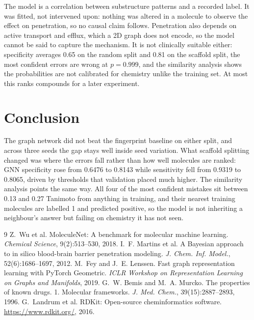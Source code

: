 \documentclass[10pt,a4paper]{article}
\begin{document}
The model is a correlation between substructure patterns and a recorded label. It was fitted, not intervened upon: nothing was altered in a molecule to observe the effect on penetration, so no causal claim follows. Penetration also depends on active transport and efflux, which a 2D graph does not encode, so the model cannot be said to capture the mechanism. It is not clinically suitable either: specificity averages 0.65 on the random split and 0.81 on the scaffold split, the most confident errors are wrong at $p = 0.999$, and the similarity analysis shows the probabilities are not calibrated for chemistry unlike the training set. At most this ranks compounds for a later experiment.

\section{Conclusion}
The graph network did not beat the fingerprint baseline on either split, and across three seeds the gap stays well inside seed variation. What scaffold splitting changed was where the errors fall rather than how well molecules are ranked: GNN specificity rose from 0.6476 to 0.8143 while sensitivity fell from 0.9319 to 0.8065, driven by thresholds that validation placed much higher. The similarity analysis points the same way. All four of the most confident mistakes sit between 0.13 and 0.27 Tanimoto from anything in training, and their nearest training molecules are labelled 1 and predicted positive, so the model is not inheriting a neighbour's answer but failing on chemistry it has not seen.


\begin{thebibliography}{9}
 Z.~Wu et al. MoleculeNet: A benchmark for molecular machine learning. \emph{Chemical Science}, 9(2):513--530, 2018.
 I.~F. Martins et al. A Bayesian approach to in silico blood-brain barrier penetration modeling. \emph{J. Chem. Inf. Model.}, 52(6):1686--1697, 2012.
 M.~Fey and J.~E. Lenssen. Fast graph representation learning with PyTorch Geometric. \emph{ICLR Workshop on Representation Learning on Graphs and Manifolds}, 2019.
 G.~W. Bemis and M.~A. Murcko. The properties of known drugs. 1. Molecular frameworks. \emph{J. Med. Chem.}, 39(15):2887--2893, 1996.
 G.~Landrum et al. RDKit: Open-source cheminformatics software. \url{https://www.rdkit.org/}, 2016.
\end{thebibliography}
\end{document}
